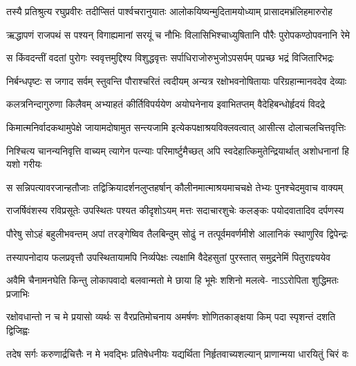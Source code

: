 \fourlineindentedshloka
{तस्यै प्रतिश्रुत्य रघुप्रवीरः}
{तदीप्सितं पार्श्वचरानुयातः}
{आलोकयिष्यन्मुदितामयोध्याम्}
{प्रासादमभ्रंलिहमारुरोह} %

\fourlineindentedshloka
{ऋद्धापणं राजपथं स पश्यन्}
{विगाह्यमानां सरयूं च नौभिः}
{विलासिभिश्चाध्युषितानि पौरैः}
{पुरोपकण्ठोपवनानि रेमे} %

\fourlineindentedshloka
{स किंवदन्तीं वदतां पुरोगः}
{स्ववृत्तमुद्दिश्य विशुद्धवृत्तः}
{सर्पाधिराजोरुभुजोऽपसर्पम्}
{पप्रच्छ भद्रं विजितारिभद्रः} %

\fourlineindentedshloka
{निर्बन्धपृष्टः स जगाद सर्वम्}
{स्तुवन्ति पौराश्चरितं त्वदीयम्}
{अन्यत्र रक्षोभवनोषितायाः}
{परिग्रहान्मानवदेव देव्याः} %

\fourlineindentedshloka
{कलत्रनिन्दागुरुणा किलैवम्}
{अभ्याहतं कीर्तिविपर्ययेण}
{अयोघनेनाय इवाभितप्तम्}
{वैदेहिबन्धोर्हृदयं विदद्रे} %

\fourlineindentedshloka
{किमात्मनिर्वादकथामुपेक्षे}
{जायामदोषामुत सन्त्यजामि}
{इत्येकपक्षाश्रयविक्लवत्वात्}
{आसीत्स दोलाचलचित्तवृत्तिः} %

\fourlineindentedshloka
{निश्चित्य चानन्यनिवृत्ति वाच्यम्}
{त्यागेन पत्न्याः परिमार्ष्टुमैच्छत्}
{अपि स्वदेहात्किमुतेन्द्रियार्थात्}
{अशोधनानां हि यशो गरीयः} %

\fourlineindentedshloka
{स सन्निपत्यावरजान्हतौजाः}
{तद्विक्रियादर्शनलुप्तहर्षान्}
{कौलीनमात्माश्रयमाचचक्षे}
{तेभ्यः पुनश्चेदमुवाच वाक्यम्} %

\fourlineindentedshloka
{राजर्षिवंशस्य रविप्रसूतेः}
{उपस्थितः पश्यत कीदृशोऽयम्}
{मत्तः सदाचारशुचेः कलङ्कः}
{पयोदवातादिव दर्पणस्य} %

\fourlineindentedshloka
{पौरेषु सोऽहं बहुलीभवन्तम्}
{अपां तरङ्गेष्विव तैलबिन्दुम्}
{सोढुं न तत्पूर्वमवर्णमीशे}
{आलानिकं स्थाणुरिव द्विपेन्द्रः} %

\fourlineindentedshloka
{तस्यापनोदाय फलप्रवृत्तौ}
{उपस्थितायामपि निर्व्यपेक्षः}
{त्यक्षामि वैदेहसुतां पुरस्तात्}
{समुद्रनेमिं पितुराज्ञ्ययेव} %

\fourlineindentedshloka
{अवैमि चैनामनघेति किन्तु}
{लोकापवादो बलवान्मतो मे}
{छाया हि भूमेः शशिनो मलत्वे-}
{नाऽऽरोपिता शुद्धिमतः प्रजाभिः} %

\fourlineindentedshloka
{रक्षोवधान्तो न च मे प्रयासो}
{व्यर्थः स वैरप्रतिमोचनाय}
{अमर्षणः शोणितकाङ्क्षया किम्}
{पदा स्पृशन्तं दशति द्विजिह्वः} %

\fourlineindentedshloka
{तदेष सर्गः करुणार्द्रचित्तैः}
{न मे भवद्भिः प्रतिषेधनीयः}
{यद्यर्थिता निर्हृतवाच्यशल्यान्}
{प्राणान्मया धारयितुं चिरं वः} %

